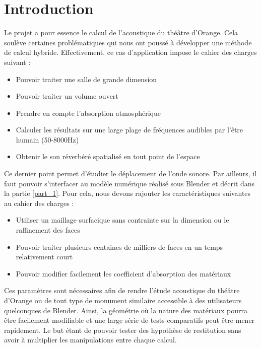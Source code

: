 \section{Introduction} \label{sect_methodecouplee}
Le projet a pour essence le calcul de l'acoustique du théâtre d'Orange. Cela soulève certaines problématiques qui nous ont poussé à développer une méthode de calcul hybride. Effectivement, ce cas d'application impose le cahier des charges suivant :
\begin{itemize}
	\item Pouvoir traiter une salle de grande dimension 
	\item Pouvoir traiter un volume ouvert
	\item Prendre en compte l'absorption atmosphérique
	\item Calculer les résultats sur une large plage de fréquences audibles par l'être humain (50-8000Hz)
	\item Obtenir le son réverbéré spatialisé en tout point de l'espace
\end{itemize}

Ce dernier point permet d'étudier le déplacement de l'onde sonore. Par ailleurs, il faut pouvoir s'interfacer au modèle numérique réalisé sous Blender et décrit dans la partie \ref{part_1}. Pour cela, nous devons rajouter les caractéristiques suivantes au cahier des charges :

\begin{itemize}
	\item Utiliser un maillage surfacique sans contrainte sur la dimension ou le raffinement des faces 
	\item Pouvoir traiter plusieurs centaines de milliers de faces en un temps relativement court 
	\item Pouvoir modifier facilement les coefficient d'absorption des matériaux
\end{itemize}

Ces paramètres sont nécessaires afin de rendre l'étude acoustique du théâtre d'Orange ou de tout type de monument similaire accessible à des utilisateurs quelconques de Blender. Ainsi, la géométrie où la nature des matériaux pourra être facilement modifiable et une large série de tests comparatifs peut être mener rapidement. Le but étant de pouvoir tester des hypothèse de restitution sans avoir à multiplier les manipulations entre chaque calcul.


